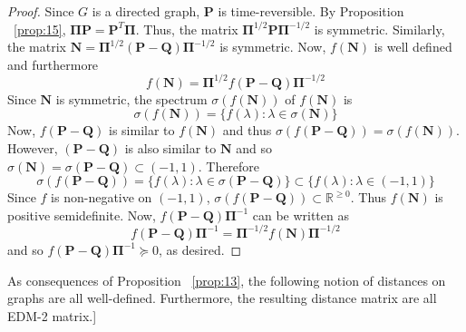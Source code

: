 \begin{proof}
  Since $G$ is a directed graph, $\mathbf{P}$ is time-reversible. By
  Proposition ~\ref{prop:15}, $\bm{\Pi}\mathbf{P} =
  \mathbf{P}^{T}\bm{\Pi}$. Thus, the matrix
  $\bm{\Pi}^{1/2}\mathbf{P}\bm{\Pi}^{-1/2}$ is
  symmetric. Similarly, the matrix $\mathbf{N} =
  \bm{\Pi}^{1/2}(\mathbf{P} - \mathbf{Q})\bm{\Pi}^{-1/2}$ is
  symmetric. Now, $f(\mathbf{N})$ is well defined and furthermore
  \begin{equation}
    \label{eq:66}
    f(\mathbf{N}) = \bm{\Pi}^{1/2}f(\mathbf{P} - \mathbf{Q})\bm{\Pi}^{-1/2}
  \end{equation}
  Since $\mathbf{N}$ is symmetric, the spectrum 
  $\sigma(f(\mathbf{N}))$ of $f(\mathbf{N})$ is
  \begin{equation}
    \label{eq:67}
    \sigma(f(\mathbf{N})) = \{ f(\lambda) \colon \lambda \in
    \sigma(\mathbf{N}) \}
  \end{equation}
  Now, $f(\mathbf{P} - \mathbf{Q})$ is similar to $f(\mathbf{N})$ and
  thus $\sigma(f(\mathbf{P} - \mathbf{Q})) =
  \sigma(f(\mathbf{N}))$. However, $(\mathbf{P} - \mathbf{Q})$ is also
  similar to $\mathbf{N}$ and so $\sigma(\mathbf{N}) =
  \sigma(\mathbf{P} - \mathbf{Q}) \subset
  (-1,1)$. Therefore 
  \begin{equation}
    \label{eq:68}
    \sigma(f(\mathbf{P} - \mathbf{Q})) = \{ f(\lambda) \colon \lambda \in
    \sigma(\mathbf{P} - \mathbf{Q})\} \subset \{ f(\lambda) \colon
    \lambda \in (-1,1) \}
  \end{equation}
  Since $f$ is non-negative on $(-1,1)$, $\sigma(f(\mathbf{P} -
  \mathbf{Q})) \subset \mathbb{R}^{\geq 0}$. Thus $f(\mathbf{N})$ is
  positive semidefinite. Now, $f(\mathbf{P} -
  \mathbf{Q})\bm{\Pi}^{-1}$ can be written as
  \begin{equation}
    \label{eq:69}
f(\mathbf{P} - \mathbf{Q})\bm{\Pi}^{-1} = \bm{\Pi}^{-1/2}
f(\mathbf{N}) \bm{\Pi}^{-1/2}
  \end{equation}
and so $f(\mathbf{P} - \mathbf{Q})\bm{\Pi}^{-1} \succeq
0$, as desired. 
\end{proof}
As consequences of Proposition ~\ref{prop:13}, the following notion of
distances on graphs are all well-defined. Furthermore, the resulting
distance matrix are all EDM-2 matrix.]
